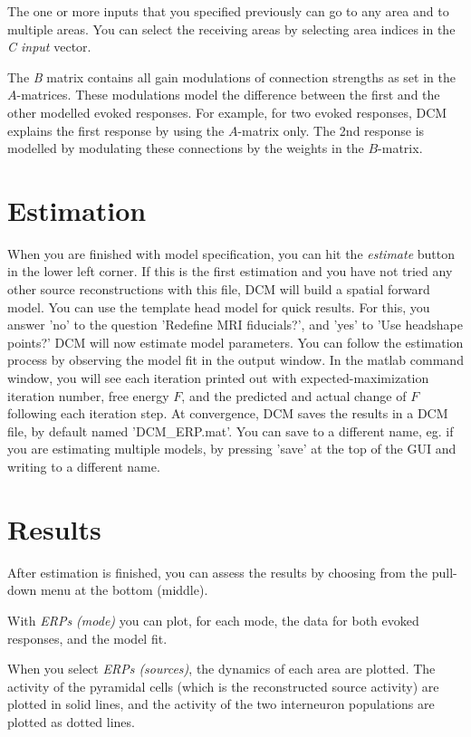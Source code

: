 The one or more inputs that you specified previously can go to any area and to multiple areas. You can select
the receiving areas by selecting area indices in the \textit{C input} vector.

The \textit{B} matrix contains all gain modulations of connection
strengths as set in the $A$-matrices. These modulations model the
difference between the first and the other modelled evoked
responses. For example, for two evoked responses, DCM explains the
first response by using the $A$-matrix only. The 2nd response is
modelled by modulating these connections by the weights in
the $B$-matrix.

\section{Estimation}
When you are finished with model specification, you can hit the
\textit{estimate} button in the lower left corner. If this is the
first estimation and you have not tried any other source
reconstructions with this file, DCM will build a spatial forward
model. You can use the template head model for quick results. For
this, you answer 'no' to the question 'Redefine MRI fiducials?', and
'yes' to 'Use headshape points?' DCM will now
estimate model parameters. You can follow the estimation process by
observing the model fit in the output window. In the matlab command
window, you will see each iteration printed out with
expected-maximization iteration number, free energy $F$, and the
predicted and actual change of $F$ following each iteration
step. At convergence, DCM saves the results in a DCM file, by default
named 'DCM\_ERP.mat'. You can save to a different name, eg. if you are estimating multiple models, by pressing 'save' at
the top of the GUI and writing to a different name.

\section{Results}
After estimation is finished, you can assess the results
by choosing from the pull-down menu at the bottom (middle).

With \textit{ERPs (mode)} you can plot, for each mode, the data for
both evoked responses, and the model fit.

When you select \textit{ERPs (sources)}, the dynamics of each area are
plotted. The activity of the pyramidal cells (which is the
reconstructed source activity) are plotted in solid
lines, and the activity of the two interneuron populations are plotted
as dotted lines.

